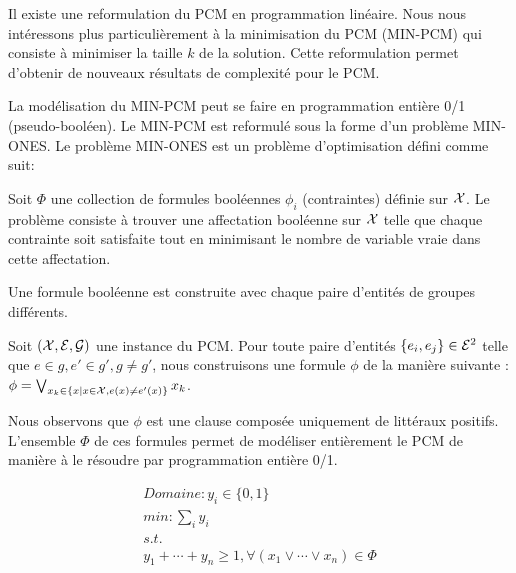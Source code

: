 Il existe une reformulation du PCM en programmation linéaire. Nous nous intéressons plus
particulièrement à la minimisation du PCM (MIN-PCM) qui consiste à minimiser la taille  $k$ de la solution. Cette reformulation permet d'obtenir de nouveaux résultats de complexité pour le PCM.


La modélisation du
MIN-PCM peut se faire en programmation entière 0/1 (pseudo-booléen). Le MIN-PCM est reformulé sous la forme d'un problème MIN-ONES. Le problème MIN-ONES est un problème d'optimisation défini comme suit:

\begin{definition}
Soit $ \Phi $ une collection de formules booléennes $\phi_i$ (contraintes)
définie sur  $\cal X$. Le problème consiste à trouver une affectation booléenne  sur $\cal X$ telle que
chaque contrainte soit satisfaite tout en minimisant le nombre de variable vraie dans cette affectation.
\end{definition}

Une formule booléenne est construite avec chaque paire d'entités de groupes différents.

Soit $({\cal X}, {\cal E}, {\cal G})$ une instance du PCM.
Pour toute paire d'entités $\{e_i,e_j\}\in {\cal E}^2$ telle que $e\in g,e'\in
g',g\neq g'$, nous construisons une formule $\phi$ de la manière suivante :\\
$\phi=\bigvee_{x_k \in \{x|x \in {\cal X}, e(x) \neq e'(x)\}} x_k $.

Nous observons que $\phi$ est une clause composée uniquement de littéraux positifs. L'ensemble $\Phi$ de ces formules permet de modéliser entièrement le PCM de manière à le résoudre par programmation entière 0/1.

\begin{center}
\[\begin{array}{l}
Domaine : y_i \in \{0,1\}\\
min : \sum_i y_i\\
s.t.\\
  y_{1}+\cdots+y_{n} \geq 1, \forall(x_{1}\vee\cdots\vee x_{n}) \in
\Phi\\
\end{array}\]
\end{center}


